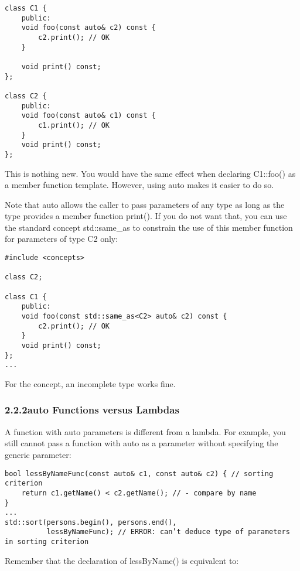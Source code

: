 \begin{lstlisting}[style=styleCXX]
class C1 {
	public:
	void foo(const auto& c2) const {
		c2.print(); // OK
	}
	
	void print() const;
};

class C2 {
	public:
	void foo(const auto& c1) const {
		c1.print(); // OK
	}
	void print() const;
};
\end{lstlisting}

This is nothing new. You would have the same effect when declaring C1::foo() as a member function template. However, using auto makes it easier to do so.

Note that auto allows the caller to pass parameters of any type as long as the type provides a member function print(). If you do not want that, you can use the standard concept std::same\_as to constrain the use of this member function for parameters of type C2 only:

\begin{lstlisting}[style=styleCXX]
#include <concepts>

class C2;

class C1 {
	public:
	void foo(const std::same_as<C2> auto& c2) const {
		c2.print(); // OK
	}
	void print() const;
};
...
\end{lstlisting}

For the concept, an incomplete type works fine.

\subsubsection*{ 2.2.2\hspace{0.2cm}auto Functions versus Lambdas}

A function with auto parameters is different from a lambda. For example, you still cannot pass a function with auto as a parameter without specifying the generic parameter:

\begin{lstlisting}[style=styleCXX]
bool lessByNameFunc(const auto& c1, const auto& c2) { // sorting criterion
	return c1.getName() < c2.getName(); // - compare by name
}
...
std::sort(persons.begin(), persons.end(),
		  lessByNameFunc); // ERROR: can’t deduce type of parameters in sorting criterion
\end{lstlisting}

Remember that the declaration of lessByName() is equivalent to:

